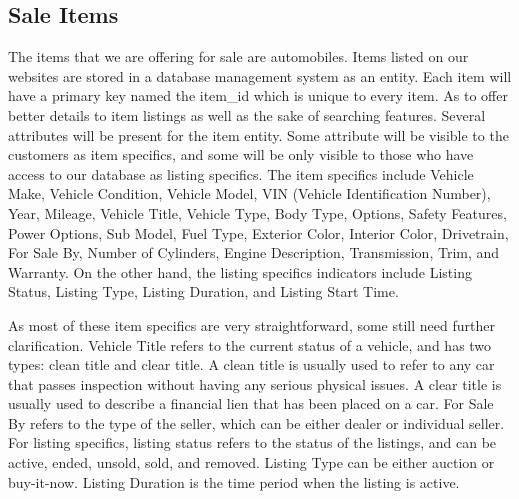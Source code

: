 \documentclass[12pt]{article}
\begin{document}
\subsection{Sale Items}
The items that we are offering for sale are automobiles. Items listed on our websites are stored in a database management system as an entity. Each item will have a primary key named the item\_id which is unique to every item. As to offer better details to item listings as well as the sake of searching features. Several attributes will be present for the item entity. Some attribute will be visible to the customers as item specifics, and some will be only visible to those who have access to our database as listing specifics. The item specifics include Vehicle Make, Vehicle Condition, Vehicle Model, VIN (Vehicle Identification Number), Year, Mileage, Vehicle Title, Vehicle Type, Body Type, Options, Safety Features, Power Options, Sub Model, Fuel Type, Exterior Color, Interior Color, Drivetrain, For Sale By, Number of Cylinders, Engine Description, Transmission, Trim, and Warranty. On the other hand, the listing specifics indicators include Listing Status, Listing Type, Listing Duration, and Listing Start Time.\par
As most of these item specifics are very straightforward, some still need further clarification. Vehicle Title refers to the current status of a vehicle, and has two types: clean title and clear title. A clean title is usually used to refer to any car that passes inspection without having any serious physical issues. A clear title is usually used to describe a financial lien that has been placed on a car. For Sale By refers to the type of the seller, which can be either dealer or individual seller. For listing specifics, listing status refers to the status of the listings, and can be active, ended, unsold, sold, and removed. Listing Type can be either auction or buy-it-now. Listing Duration is the time period when the listing is active.
\end{document}
